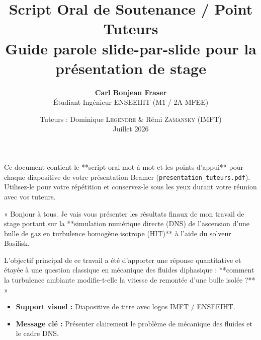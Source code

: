 \documentclass[11pt,a4paper]{article}
\title{%
    \vspace{-1cm}
    \Huge\bfseries\color{imftblue} Script Oral de Soutenance / Point Tuteurs\\[0.3cm]
    \Large Guide parole slide-par-slide pour la présentation de stage
}
\author{\textbf{Carl Bonjean Fraser} \\ \small Étudiant Ingénieur ENSEEIHT (M1 / 2A MFEE)}
\date{Tuteurs : Dominique \textsc{Legendre} \& Rémi \textsc{Zamansky} (IMFT) \\ \vspace{0.2cm} \small Juillet 2026}
\begin{document}
\maketitle

\begin{tcolorbox}[colback=imftblue!10,colframe=imftblue,title= Mode d'emploi de ce guide]
Ce document contient le **script oral mot-à-mot et les points d'appui** pour chaque diapositive de votre présentation Beamer (\texttt{presentation\_tuteurs.pdf}).  
Utilisez-le pour votre répétition et conservez-le sous les yeux durant votre réunion avec vos tuteurs.
\end{tcolorbox}

\vspace{0.5cm}

\begin{tcolorbox}[slidebox,title=Diapositive 1 : Titre et Introduction]
\begin{tcolorbox}[keybox,title=Ce qu'il faut dire à l'oral :]
« Bonjour à tous. Je vais vous présenter les résultats finaux de mon travail de stage portant sur la **simulation numérique directe (DNS) de l'ascension d'une bulle de gaz en turbulence homogène isotrope (HIT)** à l'aide du solveur Basilisk.

L'objectif principal de ce travail a été d'apporter une réponse quantitative et étayée à une question classique en mécanique des fluides diphasique : **comment la turbulence ambiante modifie-t-elle la vitesse de remontée d'une bulle isolée ?** »
\end{tcolorbox}

\begin{itemize}
    \item \textbf{Support visuel :} Diapositive de titre avec logos IMFT / ENSEEIHT.
    \item \textbf{Message clé :} Présenter clairement le problème de mécanique des fluides et le cadre DNS.
\end{itemize}
\end{tcolorbox}
\end{document}
